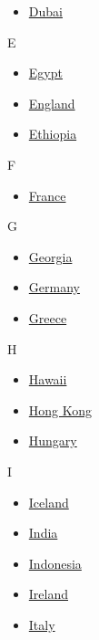 \begin{itemize}
\tightlist
\item
  \href{/travel/destinations/dubai}{Dubai}
\end{itemize}

E

\begin{itemize}
\tightlist
\item
  \href{/travel/destinations/egypt}{Egypt}
\item
  \href{/travel/destinations/england}{England}
\item
  \href{/travel/destinations/ethiopia}{Ethiopia}
\end{itemize}

F

\begin{itemize}
\tightlist
\item
  \href{/travel/destinations/france}{France}
\end{itemize}

G

\begin{itemize}
\tightlist
\item
  \href{/travel/destinations/georgia}{Georgia}
\item
  \href{/travel/destinations/germany}{Germany}
\item
  \href{/travel/destinations/greece}{Greece}
\end{itemize}

H

\begin{itemize}
\tightlist
\item
  \href{/travel/destinations/hawaii}{Hawaii}
\item
  \href{/travel/destinations/hong-kong}{Hong Kong}
\item
  \href{/travel/destinations/hungary}{Hungary}
\end{itemize}

I

\begin{itemize}
\tightlist
\item
  \href{/travel/destinations/iceland}{Iceland}
\item
  \href{/travel/destinations/india}{India}
\item
  \href{/travel/destinations/indonesia}{Indonesia}
\item
  \href{/travel/destinations/ireland}{Ireland}
\item
  \href{/travel/destinations/italy}{Italy}
\end{itemize}

